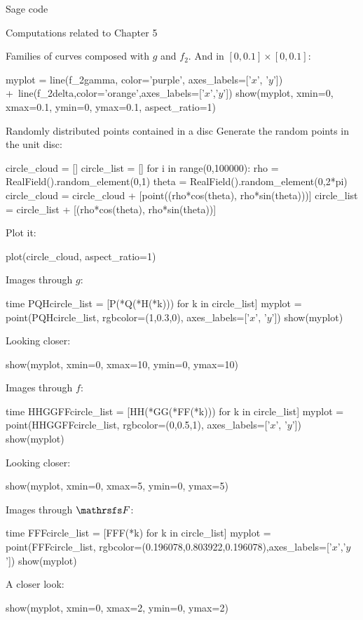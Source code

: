 \documentclass[11pt, a4paper, english, twoside, notitlepage, openright]{report}
\begin{document}
\begin{chapter}{Sage code}
\begin{section}{Computations related to Chapter 5}
\begin{subsection}{Families of curves composed with $g$ and $f_2$.}
And in $[0,0.1]\times[0,0.1]$:
\begin{sage}
myplot = line(f_2gamma, color='purple', axes_labels=['$x$', '$y$']) +\
    line(f_2delta,color='orange',axes_labels=['$x$','$y$'])
show(myplot, xmin=0, xmax=0.1, ymin=0, ymax=0.1, aspect_ratio=1)
\end{sage}
\end{subsection}

\begin{subsection}{Randomly distributed points contained in a disc}
Generate the random points in the unit disc:
\begin{sage}
circle_cloud = []
circle_list = []
for i in range(0,100000):
    rho = RealField().random_element(0,1)
    theta = RealField().random_element(0,2*pi)
    circle_cloud = circle_cloud + [point((rho*cos(theta), 
	rho*sin(theta)))]
    circle_list = circle_list + [(rho*cos(theta), 
	rho*sin(theta))]
\end{sage}

Plot it:
\begin{sage}
plot(circle_cloud, aspect_ratio=1)
\end{sage}

Images through $g$:
\begin{sage}
time PQHcircle_list = [P(*Q(*H(*k))) for k in circle_list]
myplot = point(PQHcircle_list, rgbcolor=(1,0.3,0), axes_labels=['$x$', '$y$'])
show(myplot)
\end{sage}

Looking closer:
\begin{sage}
show(myplot, xmin=0, xmax=10, ymin=0, ymax=10)
\end{sage}

Images through $f$:
\begin{sage}
time HHGGFFcircle_list = [HH(*GG(*FF(*k))) for k in circle_list]
myplot = point(HHGGFFcircle_list, rgbcolor=(0,0.5,1), axes_labels=['$x$', '$y$'])
show(myplot)
\end{sage}

Looking closer:
\begin{sage}
show(myplot, xmin=0, xmax=5, ymin=0, ymax=5)
\end{sage}

Images through $\FFF$:
\begin{sage}
time FFFcircle_list = [FFF(*k) for k in circle_list]
myplot = point(FFFcircle_list, rgbcolor=(0.196078,0.803922,0.196078),axes_labels=['$x$','$y$'])
show(myplot)
\end{sage}

A closer look:
\begin{sage}
show(myplot, xmin=0, xmax=2, ymin=0, ymax=2)
\end{sage}


\end{subsection}
\end{section}
\end{chapter}
\end{document}
